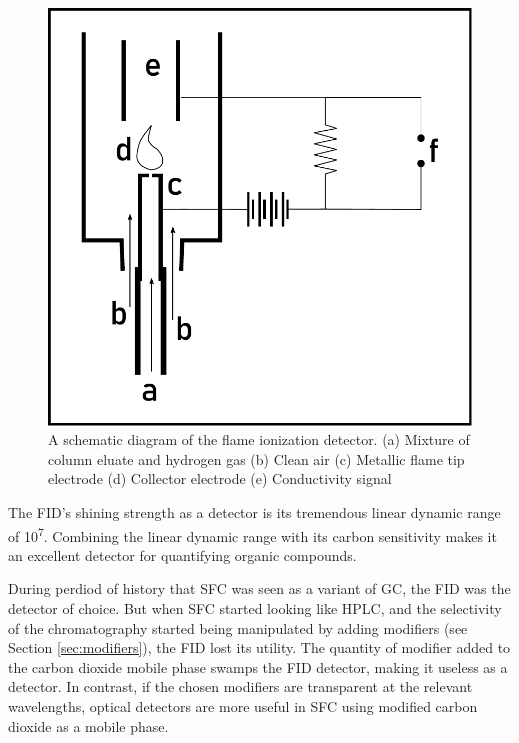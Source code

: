 \begin{figure}
\centering
\includegraphics[width=\textwidth]{Figures/FIDSchematic.pdf}
\decoRule

\caption[FID diagram]{A schematic diagram of the flame ionization detector. (a)
Mixture of column eluate and hydrogen gas (b) Clean air (c) Metallic flame tip
electrode (d) Collector electrode (e) Conductivity signal}

\label{fig:fiddiagram}

\end{figure}

The FID's shining strength as a detector is its tremendous linear dynamic range
of 10\textsuperscript{7}. Combining the linear dynamic range with its carbon
sensitivity makes it an excellent detector for quantifying organic compounds.

During perdiod of history that SFC was seen as a variant of GC, the FID was the
detector of choice. But when SFC started looking like HPLC, and the selectivity
of the chromatography started being manipulated by adding modifiers (see Section
\ref{sec:modifiers}), the FID lost its utility. The quantity of modifier added
to the carbon dioxide mobile phase swamps the FID detector, making it useless as
a detector. In contrast, if the chosen modifiers are transparent at the relevant
wavelengths, optical detectors are more useful in SFC using modified carbon
dioxide as a mobile phase.

